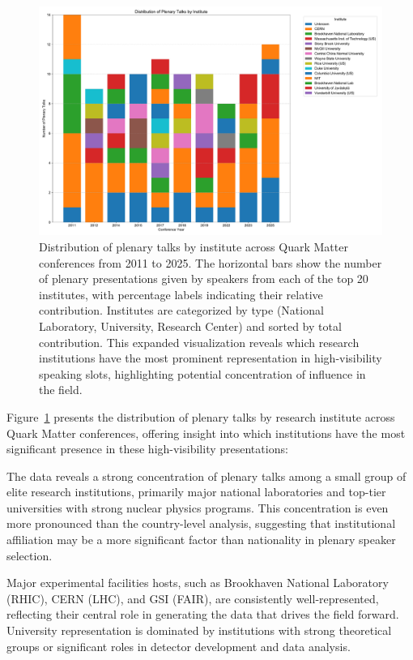 \documentclass[a4paper,11pt]{article}
\begin{document}
\begin{figure}[H]
\centering
\includegraphics[width=\textwidth]{figures/plenary_talks_by_institute.pdf}
\caption{Distribution of plenary talks by institute across Quark Matter conferences from 2011 to 2025. The horizontal bars show the number of plenary presentations given by speakers from each of the top 20 institutes, with percentage labels indicating their relative contribution. Institutes are categorized by type (National Laboratory, University, Research Center) and sorted by total contribution. This expanded visualization reveals which research institutions have the most prominent representation in high-visibility speaking slots, highlighting potential concentration of influence in the field.}
\label{fig:institute_plenary}
\end{figure}

Figure~\ref{fig:institute_plenary} presents the distribution of plenary talks by research institute across Quark Matter conferences, offering insight into which institutions have the most significant presence in these high-visibility presentations:

The data reveals a strong concentration of plenary talks among a small group of elite research institutions, primarily major national laboratories and top-tier universities with strong nuclear physics programs. This concentration is even more pronounced than the country-level analysis, suggesting that institutional affiliation may be a more significant factor than nationality in plenary speaker selection.

Major experimental facilities hosts, such as Brookhaven National Laboratory (RHIC), CERN (LHC), and GSI (FAIR), are consistently well-represented, reflecting their central role in generating the data that drives the field forward. University representation is dominated by institutions with strong theoretical groups or significant roles in detector development and data analysis.
\end{document}
